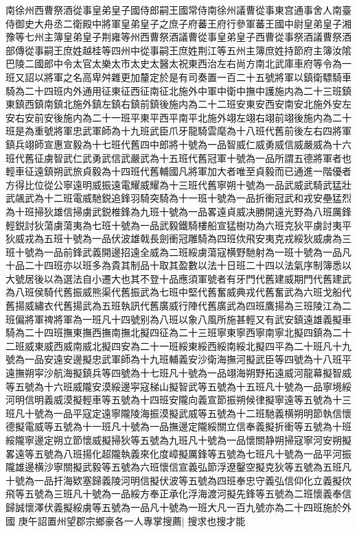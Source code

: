 {南徐州西曹祭酒從事皇弟皇子國侍郎嗣王國常侍南徐州議曹從事東宫通事舍人南臺侍御史大舟丞二衛殿中將軍皇弟皇子之庶子府蕃王府行參軍蕃王國中尉皇弟皇子湘豫等七州主簿皇弟皇子荆雍等州西曹祭酒議曹從事皇弟皇子西曹從事祭酒議曹祭酒部傳從事嗣王庶姓越桂等四州中從事嗣王庶姓荆江等五州主簿庶姓持節府主簿汝隂巴陵二國郎中令太官太樂太市太史太醫太祝東西治左右尚方南北武庫車府等令為一班又詔以將軍之名高卑舛雜更加釐定於是有司奏置一百二十五號將軍以鎮衛驃騎車騎為二十四班内外通用征東征西征南征北施外中軍中衛中撫中護施内為二十三班鎮東鎮西鎮南鎮北施外鎮左鎮右鎮前鎮後施内為二十二班安東安西安南安北施外安左安右安前安後施内為二十一班平東平西平南平北施外翊左翊右翊前翊後施内為二十班是為重號將軍忠武軍師為十九班武臣爪牙龍騎雲麾為十八班代舊前後左右四將軍鎮兵翊師宣惠宣毅為十七班代舊四中郎將十號為一品智威仁威勇威信威嚴威為十六班代舊征虜智武仁武勇武信武嚴武為十五班代舊冠軍十號為一品所謂五德將軍者也輕車征遠鎮朔武旅貞毅為十四班代舊輔國凡將軍加大者唯至貞毅而已通進一階優者方得比位從公寧遠明威振遠電耀威耀為十三班代舊寧朔十號為一品武威武騎武猛壯武飊武為十二班電威馳鋭追鋒羽騎突騎為十一班十號為一品折衝冠武和戎安壘猛烈為十班掃狄雄信掃虜武鋭椎鋒為九班十號為一品畧遠貞威决勝開遠光野為八班厲鋒輕鋭討狄蕩虜蕩夷為七班十號為一品武毅鐵騎樓船宣猛樹功為六班克狄平虜討夷平狄威戎為五班十號為一品伏波雄戟長劍衝冠雕騎為四班佽飛安夷克戎綏狄威虜為三班十號為一品前鋒武義開邊招遠全威為二班綏虜蕩寇横野馳射為一班十號為一品凡十品二十四班亦以班多為貴其制品十取其盈數以法十日班二十四以法氣序制簿悉以大號居後以為選法自小遷大也其不登十品應須軍號者有牙門代舊建威期門代舊建武為八班侯騎代舊振威熊渠代舊振武為七班中堅代舊奮威典戎代舊奮武為六班戈船代舊揚威繡衣代舊揚武為五班執訊代舊廣威行陣代舊廣武為四班鷹揚為三班陵江為二班偏將軍禆將軍為一班凡十四號别為八班以象八風所施甚輕又有武安鎮遠雄義擬車騎為二十四班撫東撫西撫南撫北擬四征為二十三班寧東寧西寧南寧北擬四鎮為二十二班威東威西威南威北擬四安為二十一班綏東綏西綏南綏北擬四平為二十班凡十九號為一品安遠安邊擬忠武軍師為十九班輔義安沙衛海撫河擬武臣等四號為十八班平遠撫朔寜沙航海擬鎮兵等四號為十七班凡十號為一品翊海朔野拓遠威河龍幕擬智威等五號為十六班威隴安漠綏邊寜寇梯山擬智武等五號為十五班凡十號為一品寧境綏河明信明義威漠擬輕車等五號為十四班安隴向義宣節振朔候律擬寧遠等五號為十三班凡十號為一品平寇定遠寧隴陵海振漠擬武威等五號為十二班馳義横朔明節執信懷德擬電威等五號為十一班凡十號為一品撫邊定隴綏關立信奉義擬折衝等五號為十班綏隴寧邊定朔立節懷威擬掃狄等五號為九班凡十號為一品懷關静朔掃寇寧河安朔擬畧遠等五號為八班揚化超隴執義來化度嶂擬厲鋒等五號為七班凡十號為一品平河振隴雄邊横沙寧關擬武毅等五號為六班懷信宣義弘節浮遼鑿空擬克狄等五號為五班凡十號為一品扞海欵塞歸義陵河明信擬伏波等五號為四班奉忠守義弘信仰化立義擬佽飛等五號為三班凡十號為一品綏方奉正承化浮海渡河擬先鋒等五號為二班懷義奉信歸誠懷澤伏義擬綏虜等五號為一品凡十號為一班大凡一百九號亦為二十四班施於外國}
庚午詔置州望郡宗鄉豪各一人專掌搜薦|{
	搜求也搜才能}


